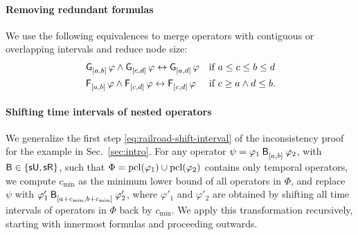 \documentclass[acmsmall,screen]{acmart}
\begin{document}
\paragraph{Removing redundant formulas}
We use the following equivalences to merge operators with contiguous or overlapping intervals and reduce node size:
\begin{align*}
&\glob{[a,b]} \varphi \land \glob{[c,d]} \varphi \iff \glob{[a,d]} \varphi && \text{if } a \leq c \leq b \leq d \\
&\even{[a,b]} \varphi \land \even{[c,d]} \varphi \iff \even{[c,d]} \varphi && \text{if } c \geq a \land d \leq b.
\end{align*}

\paragraph{Shifting time intervals of nested operators}
We generalize the first step \eqref{eq:railroad-shift-interval} of the inconsistency proof for the example in Sec.~\ref{sec:intro}.
For any operator $\psi = \anybinop{[a,b]}{\varphi_1}{\varphi_2}$, with $\mathsf{B} \in \set{\suntilop, \sreleaseop}$,
such that $\Phi = \pcl(\varphi_1) \cup \pcl(\varphi_2)$ contains only temporal operators,
we compute $c_{\min}$ as the minimum lower bound of all operators in $\Phi$,
and replace $\psi$ with $\anybinop{[a+c_{\min},b+c_{\min}]}{\varphi'_1}{\varphi'_2}$,
where $\varphi'_1$ and $\varphi'_2$ are obtained by shifting all time intervals of operators in $\Phi$
back by $c_{\min}$.
We apply this transformation recursively, starting with innermost formulas and proceeding outwards.

\end{document}
